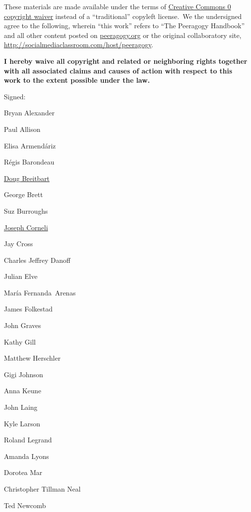 These materials are made available under the terms of
\href{http://creativecommons.org/publicdomain/zero/1.0/}{Creative
Commons 0 copyright waiver} instead of a ``traditional'' copyleft
license.~We the undersigned agree to the following, wherein ``this
work'' refers to ``The Peeragogy Handbook'' and all other content posted
on \href{http://peeragogy.org}{peeragogy.org} or the original
collaboratory site,
\url{http://socialmediaclassroom.com/host/peeragogy}.

\textbf{I hereby waive all copyright and related or neighboring rights
together with all associated claims and causes of action with respect to
this work to the extent possible under the law.}

Signed:

\noindent \begin{commalist}[before=\itshape,font=\normalfont] 
\itemsep1pt\parskip0pt
\item
  Bryan Alexander
\item
  Paul Allison
\item
  Elisa Armendáriz
\item
  Régis Barondeau
\item
  \href{https://www.linkedin.com/in/dougbreitbart}{Doug Breitbart}
\item
  George Brett
\item
  Suz Burroughs
\item
  \href{http://metameso.org/~joe}{Joseph Corneli}
\item
  Jay Cross
\item
  Charles Jeffrey Danoff
\item
  Julian Elve
\item
  María Fernanda~Arenas
\item
  James Folkestad
\item
  John Graves
\item
  Kathy Gill
\item
  Matthew Herschler
\item
  Gigi Johnson
\item
  Anna Keune
\item
  John Laing
\item
  Kyle Larson
\item
  Roland Legrand
\item
  Amanda Lyons
\item
  Dorotea Mar
\item
  Christopher Tillman Neal
\item
  Ted Newcomb
\item

\end{commalist}
